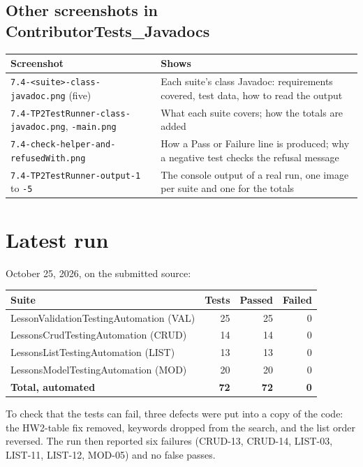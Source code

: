 \documentclass[10pt]{article}
\begin{document}
\begin{small}

\end{small}

\subsection*{Other screenshots in ContributorTests\_Javadocs}
\begin{tabularx}{\linewidth}{@{}l X@{}}
\toprule
\textbf{Screenshot} & \textbf{Shows} \\
\midrule
\texttt{7.4-<suite>-class-javadoc.png} (five) & Each suite's class Javadoc: requirements covered, test data, how to read the output \\
\texttt{7.4-TP2TestRunner-class-javadoc.png}, \texttt{-main.png} & What each suite covers; how the totals are added \\
\texttt{7.4-check-helper-and-refusedWith.png} & How a Pass or Failure line is produced; why a negative test checks the refusal message \\
\texttt{7.4-TP2TestRunner-output-1} to \texttt{-5} & The console output of a real run, one image per suite and one for the totals \\
\bottomrule
\end{tabularx}

\section*{Latest run}
October 25, 2026, on the submitted source:

\begin{tabularx}{\linewidth}{@{}X r r r@{}}
\toprule
\textbf{Suite} & \textbf{Tests} & \textbf{Passed} & \textbf{Failed} \\
\midrule
LessonValidationTestingAutomation (VAL) & 25 & 25 & 0 \\
LessonsCrudTestingAutomation (CRUD) & 14 & 14 & 0 \\
LessonsListTestingAutomation (LIST) & 13 & 13 & 0 \\
LessonsModelTestingAutomation (MOD) & 20 & 20 & 0 \\
\midrule
\textbf{Total, automated} & \textbf{72} & \textbf{72} & \textbf{0} \\
\bottomrule
\end{tabularx}

To check that the tests can fail, three defects were put into a copy of the code: the HW2-table
fix removed, keywords dropped from the search, and the list order reversed. The run then reported
six failures (CRUD-13, CRUD-14, LIST-03, LIST-11, LIST-12, MOD-05) and no false passes.
\end{document}

